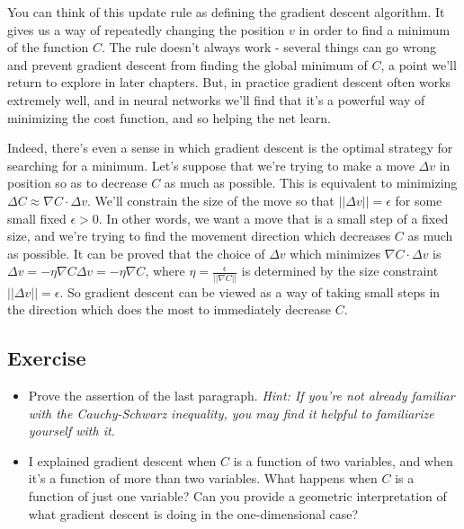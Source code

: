 \documentclass[a4paper,12pt]{report}%
\begin{document}
You can think of this update rule as defining the gradient descent algorithm. It gives us a way of repeatedly changing the position $v$ in order to find a minimum of the function $C$. The rule doesn't always work - several things can go wrong and prevent gradient descent from finding the global minimum of $C$, a point we'll return to explore in later chapters. But, in practice gradient descent often works extremely well, and in neural networks we'll find that it's a powerful way of minimizing the cost function, and so helping the net learn.

Indeed, there's even a sense in which gradient descent is the optimal strategy for searching for a minimum. Let's suppose that we're trying to make a move $\Delta v$ in position so as to decrease $C$ as much as possible. This is equivalent to minimizing $\Delta C \approx \nabla C \cdot \Delta v$. We'll constrain the size of the move so that $|| \Delta v || = \epsilon$ for some small fixed $\epsilon > 0$. In other words, we want a move that is a small step of a fixed size, and we're trying to find the movement direction which decreases $C$ as much as possible. It can be proved that the choice of $\Delta v$ which minimizes $\nabla C \cdot \Delta v $ is $\Delta v = −\eta \nabla C \Delta v = −\eta \nabla C$, where $\eta = \frac{\epsilon}{||\nabla C||}$ is determined by the size constraint $ ||\Delta v|| = \epsilon $. So gradient descent can be viewed as a way of taking small steps in the direction which does the most to immediately decrease $C$.

\subsection{Exercise}
\begin{itemize}
\item Prove the assertion of the last paragraph. {\it Hint: If you're not already familiar with the Cauchy-Schwarz inequality, you may find it helpful to familiarize yourself with it.}

\item I explained gradient descent when $C$ is a function of two variables, and when it's a function of more than two variables. What happens when $C$ is a function of just one variable? Can you provide a geometric interpretation of what gradient descent is doing in the one-dimensional case?
\end{itemize}
\end{document}
